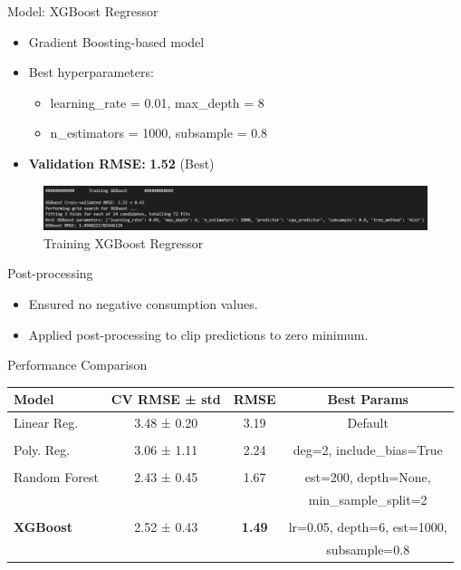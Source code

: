 \documentclass{beamer}
\begin{document}
\begin{frame}{Model: XGBoost Regressor}
  \begin{itemize}
    \item Gradient Boosting-based model
    \item Best hyperparameters:
    \begin{itemize}
        \item learning\_rate = 0.01, max\_depth = 8
        \item n\_estimators = 1000, subsample = 0.8
    \end{itemize}
    \item \textbf{Validation RMSE:} \textbf{1.52} (Best)
  \end{itemize}
  \begin{figure}
\vfill
    \centering
    \includegraphics[width=0.6\linewidth]{images/xgboost.png}
    \caption{Training XGBoost Regressor}
    \label{fig:enter-label}
\end{figure}
\end{frame}

\begin{frame}{Post-processing}
  \begin{itemize}
    \item Ensured no negative consumption values.
    \item Applied post-processing to clip predictions to zero minimum.
  \end{itemize}
\end{frame}

\begin{frame}{Performance Comparison}
\small
    \begin{tabular}{lccc}
        \toprule
        \textbf{Model} & \textbf{CV RMSE ± std} & \textbf{RMSE} & \textbf{Best Params} \\
        \midrule
        Linear Reg. & 3.48 ± 0.20 & 3.19 & Default \\
        &&&\\
        Poly. Reg. & 3.06 ± 1.11 & 2.24 & deg=2, include\_bias=True \\
        &&&\\
        Random Forest & 2.43 ± 0.45 & 1.67 & est=200, depth=None, \\ &&&min\_sample\_split=2 \\
        &&&\\
        \textbf{XGBoost} & 2.52 ± 0.43 & \textbf{1.49} & lr=0.05, depth=6, est=1000,\\ &&&subsample=0.8\\
        \bottomrule
    \end{tabular}
\end{frame}
\end{document}

